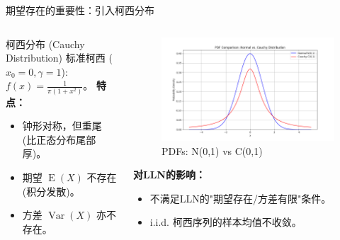 \documentclass[UTF8]{beamer}
\DeclareMathOperator{\E}{\operatorname{E}}
\DeclareMathOperator{\Var}{\operatorname{Var}}
\begin{document}
\begin{frame}[shrink=10]{期望存在的重要性：引入柯西分布}
\begin{columns}[T]
\begin{column}{0.55\textwidth}
\begin{block}{柯西分布 (Cauchy Distribution)}
                标准柯西 ($x_0=0, \gamma=1$): $f(x) = \frac{1}{\pi (1+x^2)}$。
                \textbf{特点：}
                \begin{itemize}
                    \item 钟形对称，但\alert{重尾} (比正态分布尾部厚)。
                    \item \alert{期望 $\E(X)$ 不存在} (积分发散)。
                    \item \alert{方差 $\Var(X)$ 亦不存在}。
                \end{itemize}
            \end{block}
        \end{column}
        \begin{column}{0.4\textwidth}
            \begin{figure}
                \centering
                \includegraphics[width=\linewidth]{pdf_normal_cauchy_comparison.png} %
                \caption{PDFs: N(0,1) vs C(0,1)} %
            \end{figure}
            \textbf{对LLN的影响：}
            \begin{itemize}
                \item 不满足LLN的"期望存在/方差有限"条件。
                \item i.i.d. 柯西序列的样本均值\alert{不收敛}。
            \end{itemize}
        \end{column}
    \end{columns}

\end{frame}
\end{document}
